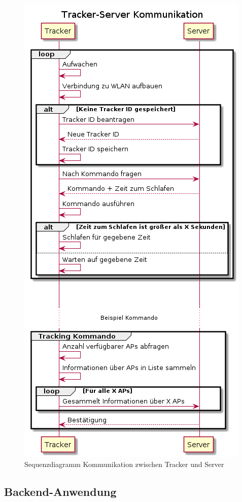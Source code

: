 \begin{figure}[]
	\includegraphics[height=0.9\textheight]{images/communication.png}
	\centering
	\caption{Sequenzdiagramm Kommunikation zwischen Tracker und Server}
	\label{fig:tracker_comm}
\end{figure}

\FloatBarrier
\subsection{Backend-Anwendung} \label{sec:backend}

